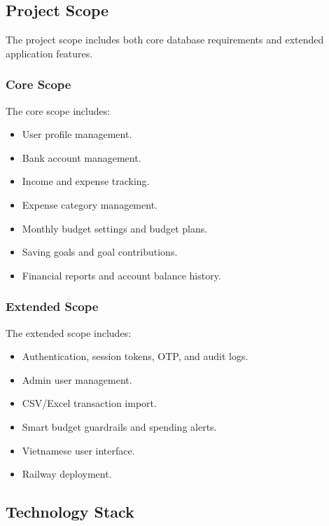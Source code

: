 ﻿\documentclass{article}
\begin{document}
\subsection{Project Scope}
The project scope includes both core database requirements and extended application features.

\subsubsection{Core Scope}
The core scope includes:
\begin{itemize}
    \item User profile management.
    \item Bank account management.
    \item Income and expense tracking.
    \item Expense category management.
    \item Monthly budget settings and budget plans.
    \item Saving goals and goal contributions.
    \item Financial reports and account balance history.
\end{itemize}

\subsubsection{Extended Scope}
The extended scope includes:
\begin{itemize}
    \item Authentication, session tokens, OTP, and audit logs.
    \item Admin user management.
    \item CSV/Excel transaction import.
    \item Smart budget guardrails and spending alerts.
    \item Vietnamese user interface.
    \item Railway deployment.
\end{itemize}

\subsection{Technology Stack}

\small
\renewcommand{\arraystretch}{1.15}
\end{document}
